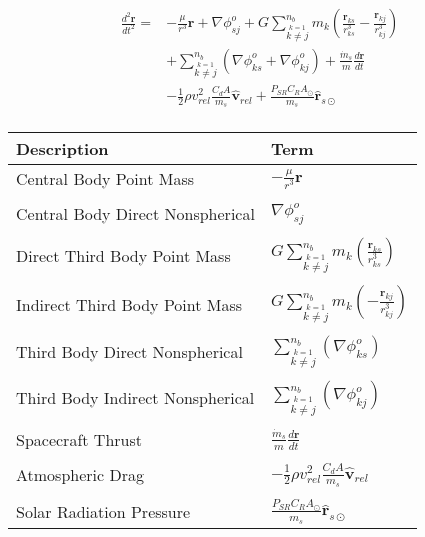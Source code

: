 \begin{equation} \begin{split}
    \frac{d^2\mathbf{r}}{dt^2}
    =  &-\frac{\mu}{r^3}\mathbf{r} +  \nabla \phi_{sj}^o +
    G\sum_{\stackrel{k=1}{k \neq j}}^{n_b}m_k \left(\frac{\mathbf{r}_{ks}}{r_{ks}^3} -
     \frac{\mathbf{r}_{kj} }{r_{kj}^3}   \right)\\
   & + \sum_{\stackrel{k=1}{k \neq j}}^{n_b}\left( \nabla
    \phi_{ks}^o +
     \nabla\phi_{kj}^o
     \right)+ \frac{\dot{m}_s }{m}\frac{d\mathbf{r}}{dt}\\ & - \frac{1}{2}\rho v_{rel}^2 \frac{C_d A}{m_s}\hat{\mathbf{v}}_{rel}
     +\frac{   P_{SR}C_R A_{\odot}   }{m_s}\hat{\mathbf{r}}_{s\odot}\\
     \end{split} \label{Eq:CompleteEOM}
\end{equation}
%
\begin{table}[h]
\centering
\begin{tabular}{p{2.0 in} p{1.0 in} }
  \hline\hline
  Description & Term \\
  \hline
  Central Body Point Mass & $ -\displaystyle\frac{\mu}{r^3}\mathbf{r}$ \\
  & \\
  Central Body Direct Nonspherical &  $\nabla \phi_{sj}^o$  \\
  & \\
  Direct Third Body Point Mass & $G\displaystyle\sum_{\stackrel{k=1}{k \neq j}}^{n_b}m_k \left(\frac{\mathbf{r}_{ks}}{r_{ks}^3}\right)$ \\
   & \\
  Indirect Third Body Point Mass &  $G\displaystyle\sum_{\stackrel{k=1}{k \neq j}}^{n_b}m_k \left( -
     \frac{\mathbf{r}_{kj} }{r_{kj}^3}   \right)$ \\
      & \\
   Third Body Direct Nonspherical & $\displaystyle\sum_{\stackrel{k=1}{k \neq j}}^{n_b}\left( \nabla
    \phi_{ks}^o\right)$  \\
    &\\
    Third Body Indirect Nonspherical &  $\sum_{\stackrel{k=1}{k \neq j}}^{n_b}\left(
     \nabla\phi_{kj}^o \right)$\\
    & \\
   Spacecraft Thrust &$\displaystyle\frac{\dot{m}_s }{m}\frac{d\mathbf{r}}{dt}$\\
   &\\
   Atmospheric Drag & $- \displaystyle\frac{1}{2}\rho v_{rel}^2 \displaystyle\frac{C_d
   A}{m_s}\hat{\mathbf{v}}_{rel}$\\
   &\\
   Solar Radiation Pressure & $\displaystyle\frac{   P_{SR}C_R A_{\odot}   }{m_s}\hat{\mathbf{r}}_{s\odot}$\\
  \hline\hline
\end{tabular}
\end{table}
%


